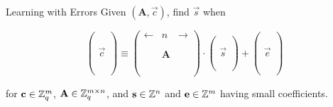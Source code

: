 \documentclass[xcolor=table,10pt,aspectratio=169]{beamer}
\begin{document}
\begin{frame}[label={sec:orgb43d3e5}]{Learning with Errors}
Given \((\mathbf{A},\vec{c})\), find \(\vec{s}\) when

\[
\left(\begin{array}{c}
\\
\\
\\ 
\vec{c} \\
\\
\\
\\
\end{array} \right) \equiv \left(
\begin{array}{ccc}
\leftarrow & n & \rightarrow \\
\\
\\ 
& \mathbf{A} & \\
\\
\\
\\
\end{array} \right) \cdot \left( \begin{array}{c}
\\\
\\
\vec{s} \\
\\
\\
\end{array} \right) + \left(
\begin{array}{c}
\\
\\
\\ 
\vec{e} \\
\\
\\
\\
\end{array} 
\right)
\]

for \(\mathbf{c} \in \mathbb{Z}_q^{m}\), \(\mathbf{A} \in \mathbb{Z}_q^{m \times n}\), and \(\mathbf{s} \in \mathbb{Z}^{n}\) and \(\mathbf{e} \in \mathbb{Z}^{m}\) having small coefficients.
\end{frame}
\end{document}
